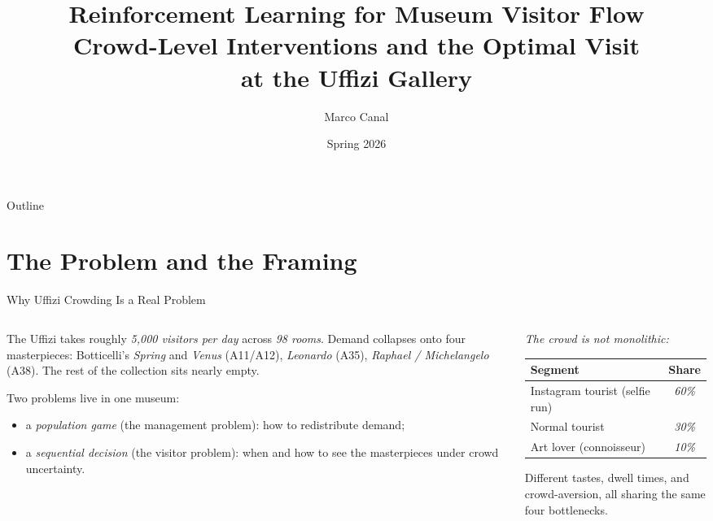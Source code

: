 \documentclass[aspectratio=169, 11pt]{beamer}
\title[Uffizi RL]{Reinforcement Learning for Museum Visitor Flow\\
       Crowd-Level Interventions and the Optimal Visit\\
       at the Uffizi Gallery}
\subtitle{}
\author[Marco Canal]{\normalsize Marco Canal}
\institute[BSE]{\large Reinforcement Learning, Barcelona School of Economics}
\date{Spring 2026}
\newcommand{\thead}[1]{\textbf{#1}}
\newcommand{\emp}[1]{\textit{#1}}
\begin{document}
\begin{frame}\titlepage\end{frame}

\begin{frame}{Outline}
\scriptsize\tableofcontents
\end{frame}

\section{The Problem and the Framing}

\begin{frame}{Why Uffizi Crowding Is a Real Problem}
\footnotesize
\begin{columns}[T]
\begin{column}{0.56\textwidth}
The Uffizi takes roughly \emp{5{,}000 visitors per day} across \emp{98 rooms}.
Demand collapses onto four masterpieces: Botticelli's \emp{Spring} and \emp{Venus}
(A11/A12), \emp{Leonardo} (A35), \emp{Raphael / Michelangelo} (A38). The rest of the
collection sits nearly empty.

\vspace{0.4em}
Two problems live in one museum:
\begin{itemize}\setlength\itemsep{2pt}
\item a \emp{population game} (the management problem): how to redistribute demand;
\item a \emp{sequential decision} (the visitor problem): when and how to see the
      masterpieces under crowd uncertainty.
\end{itemize}
\end{column}
\begin{column}{0.42\textwidth}
\centering
\emp{The crowd is not monolithic:}
\vspace{0.3em}
\begin{tabular}{lc}
\toprule
\thead{Segment} & \thead{Share} \\
\midrule
Instagram tourist (selfie run) & \emp{60\%} \\
Normal tourist & \emp{30\%} \\
Art lover (connoisseur) & \emp{10\%} \\
\bottomrule
\end{tabular}
\vspace{0.5em}

\footnotesize Different tastes, dwell times, and crowd-aversion, all sharing the
same four bottlenecks.
\end{column}
\end{columns}
\end{frame}
\end{document}
